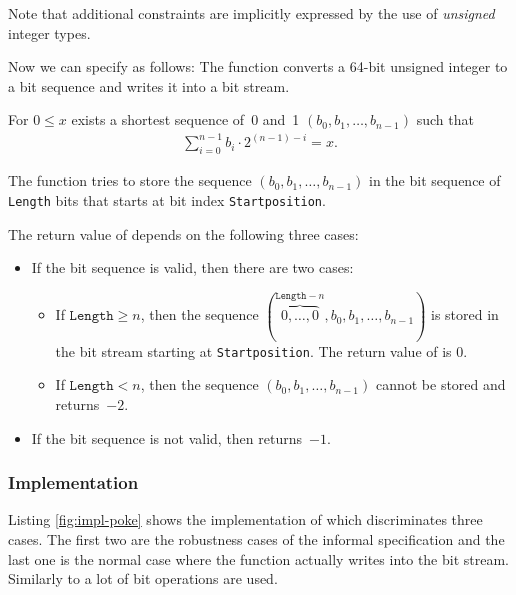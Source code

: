 Note that additional constraints are implicitly expressed by the use
of \emph{unsigned} integer types.


Now we can specify \poke as follows:
The function \poke converts a 64-bit unsigned integer to a bit sequence and 
writes it into a bit stream.

For $0 \leq x$ exists a shortest sequence of~0 and~1
$(b_0, b_1,\ldots,b_{n - 1})$
such that
\begin{align}
    \sum_{i=0}^{n-1} b_i \cdot 2^{(n - 1) - i} = x.
\end{align}

The function \poke tries to store the sequence $(b_0, b_1,\ldots,b_{n - 1})$
in the bit sequence of \texttt{Length} bits that starts
at bit index \texttt{Startposition}.

The return value of \poke depends on the following three cases:

\begin{itemize}
\item 
If the bit sequence is valid, then there are two cases:

\begin{itemize}
\item
If $\texttt{Length} \geq n$, then  the sequence
$(\overbrace{0,\ldots,0}^{\texttt{Length}-n},b_0, b_1,\ldots,b_{n - 1})$
is stored in the bit stream starting at \texttt{Startposition}.
The return value of \poke is 0.

\item
If $\texttt{Length} < n$, then the
sequence $(b_0, b_1,\ldots,b_{n - 1})$ cannot be stored and\\
\poke returns~$-2$.
\end{itemize}

\item 
If the bit sequence is not valid, then \poke returns~$-1$.
\end{itemize}

\subsubsection{Implementation}
\label{sec:impl-poke}
Listing \ref{fig:impl-poke} shows the implementation of \poke
which discriminates three cases. The first two are the robustness cases
of the informal specification and the last one is
the normal case where the function actually writes into the bit stream.
Similarly to \peek a lot of bit operations are used. 

